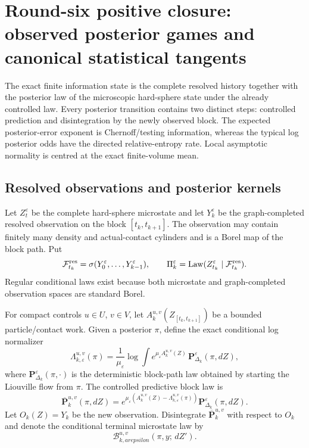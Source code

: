 \section{Round-six positive closure: observed posterior games and canonical statistical tangents}
\label{sec:r6-c1}

The exact finite information state is the complete resolved history together
with the posterior law of the microscopic hard-sphere state under the already
controlled law.  Every posterior transition contains two distinct steps:
controlled prediction and disintegration by the newly observed block.  The
expected posterior-error exponent is Chernoff/testing information, whereas the
typical log posterior odds have the directed relative-entropy rate.  Local
asymptotic normality is centred at the exact finite-volume mean.

\subsection{Resolved observations and posterior kernels}

Let \(Z_t^\varepsilon\) be the complete hard-sphere microstate and let
\(Y_k^\varepsilon\) be the graph-completed resolved observation on the block
\([t_k,t_{k+1}]\).  The observation may contain finitely many density and
actual-contact cylinders and is a Borel map of the block path.  Put
\[
\mathcal F_{t_k}^{\rm res}=\sigma(Y_0^\varepsilon,\ldots,Y_{k-1}^\varepsilon),
\qquad
\Pi_k^\varepsilon=
\operatorname{Law}(Z_{t_k}^\varepsilon\mid
\mathcal F_{t_k}^{\rm res}).
\]
Regular conditional laws exist because both microstate and graph-completed
observation spaces are standard Borel.

For compact controls \(u\in U\), \(v\in V\), let
\(A_k^{u,v}(Z_{[t_k,t_{k+1}]})\) be a bounded particle/contact work.  Given a
posterior \(\pi\), define the exact conditional log normalizer
\[
\Lambda_{k,\varepsilon}^{u,v}(\pi)=
\frac1{\mu_\varepsilon}\log
\int e^{\mu_\varepsilon A_k^{u,v}(Z)}\,
\mathbf P_{\Delta_k}^\varepsilon(\pi,dZ),
\]
where \(\mathbf P_{\Delta_k}^\varepsilon(\pi,\cdot)\) is the deterministic
block-path law obtained by starting the Liouville flow from \(\pi\).
The controlled predictive block law is
\[
\overline{\mathbf P}_{k}^{u,v}(\pi,dZ)=
 e^{\mu_\varepsilon(A_k^{u,v}(Z)-
 \Lambda_{k,\varepsilon}^{u,v}(\pi))}
\mathbf P_{\Delta_k}^\varepsilon(\pi,dZ).
\]
Let \(O_k(Z)=Y_k\) be the new observation.  Disintegrate
\(\overline{\mathbf P}_{k}^{u,v}\) with respect to \(O_k\) and denote the
conditional terminal microstate law by
\[
\mathcal B_{k,arepsilon}^{u,v}(\pi,y;\,dZ').
\]

